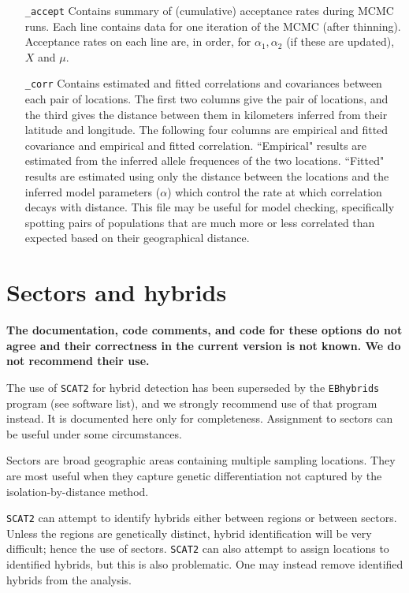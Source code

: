 \documentclass[10pt,titlepage,times,letterpaper]{article}
\def\SCAT{{\tt SCAT2} }
\begin{document}
\begin{enumerate}[\_params]
\item[{\tt \_accept}] Contains summary of (cumulative) acceptance rates
during MCMC runs. Each line contains data for one iteration of the
MCMC (after thinning). Acceptance rates on each line are, in order,
for $\alpha_1,\alpha_2$ (if these are updated), $X$ and $\mu$.
\item[{\tt \_corr}] Contains estimated and fitted correlations
and covariances between each pair of locations.  The first two columns
give the pair of locations, and the third gives the distance between them
in kilometers inferred from their latitude and longitude.  The following
four columns are empirical and fitted covariance and empirical and
fitted correlation.  ``Empirical" results are estimated from the inferred
allele frequences of the two locations.  ``Fitted" results are estimated
using only the distance between the locations and the inferred model
parameters ($\alpha$) which control the rate at which correlation decays
with distance.  This file may be useful for model checking, specifically
spotting pairs of populations that are much more or less correlated than
expected based on their geographical distance.
\end{enumerate}







\section{Sectors and hybrids}

{\bf The documentation, code comments, and code for these options do
not agree and their correctness in the current version is not known.
We do not recommend their use.}

The use of \SCAT for hybrid detection
has been superseded by the {\tt EBhybrids}
program (see software list), and we strongly recommend use of that 
program instead.  It is documented here only for completeness. 
Assignment to sectors can be useful under some circumstances.

Sectors are broad geographic areas containing multiple sampling
locations.  They are most useful when they capture genetic differentiation
not captured by the isolation-by-distance method.

\SCAT can attempt to identify hybrids either between regions or
between sectors.  Unless the regions are genetically
distinct, hybrid identification will be very difficult; hence the
use of sectors.  \SCAT can also attempt to assign locations to
identified hybrids, but this is also problematic.  One may instead
remove identified hybrids from the analysis.
\end{document}
